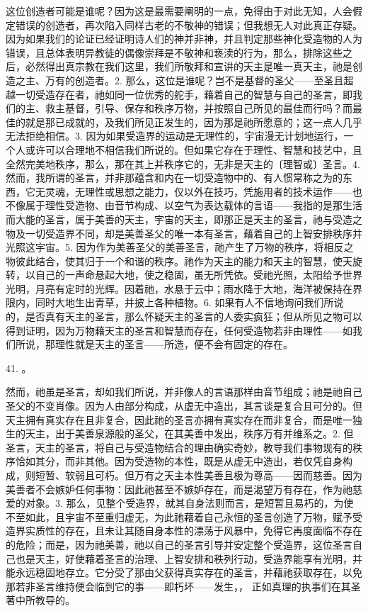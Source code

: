 这位创造者可能是谁呢？因为这是最需要阐明的一点，免得由于对此无知，人会假定错误的创造者，再次陷入同样古老的不敬神的错误；但我想无人对此真正存疑。因为如果我们的论证已经证明诗人们的神并非神，并且判定那些神化受造物的人为错误，且总体表明异教徒的偶像崇拜是不敬神和亵渎的行为，那么，排除这些之后，必然得出真宗教在我们这里，我们所敬拜和宣讲的天主是唯一真天主，祂是创造之主、万有的创造者。2. 那么，这位是谁呢？岂不是基督的圣父——至圣且超越一切受造存在者，祂如同一位优秀的舵手，藉着自己的智慧与自己的圣言，即我们的主、救主基督，引导、保存和秩序万物，并按照自己所见的最佳而行吗？而最佳的就是那已成就的，及我们所见正发生的，因为那是祂所愿意的；这一点人几乎无法拒绝相信。3. 因为如果受造界的运动是无理性的，宇宙漫无计划地运行，一个人或许可以合理地不相信我们所说的。但如果它存在于理性、智慧和技艺中，且全然完美地秩序，那么，那在其上并秩序它的，无非是天主的〔理智或〕圣言。4. 然而，我所谓的圣言，并非那蕴含和内在一切受造物中的、有人惯常称之为的东西，它无灵魂，无理性或思想之能力，仅以外在技巧，凭施用者的技术运作——也不像属于理性受造物、由音节构成、以空气为表达载体的言语——我指的是那生活而大能的圣言，属于美善的天主，宇宙的天主，即那正是天主的圣言，祂与受造之物及一切受造界不同，却是美善圣父的唯一本有圣言，藉着自己的上智安排秩序并光照这宇宙。5. 因为作为美善圣父的美善圣言，祂产生了万物的秩序，将相反之物彼此结合，使其归于一个和谐的秩序。祂作为天主的能力和天主的智慧，使天旋转，以自己的一声命悬起大地，使之稳固，虽无所凭依。受祂光照，太阳给予世界光明，月亮有定时的光辉。因着祂，水悬于云中；雨水降于大地，海洋被保持在界限内，同时大地生出青草，并披上各种植物。6. 如果有人不信地询问我们所说的，是否真有天主的圣言，那么怀疑天主的圣言的人委实疯狂；但从所见之物可以得到证明，因为万物藉天主的圣言和智慧而存在，任何受造物若非由理性——如我们所说，那理性就是天主的圣言——所造，便不会有固定的存在。\par

41. 。\par

然而，祂虽是圣言，却如我们所说，并非像人的言语那样由音节组成；祂是祂自己圣父的不变肖像。因为人由部分构成，从虚无中造出，其言谈是复合且可分的。但天主拥有真实存在且非复合，因此祂的圣言亦拥有真实存在而非复合，而是唯一独生的天主，出于美善泉源般的圣父，在其美善中发出，秩序万有并维系之。2. 但圣言，天主的圣言，将自己与受造物结合的理由确实奇妙，教导我们事物现有的秩序恰如其分，而非其他。因为受造物的本性，既是从虚无中造出，若仅凭自身构成，则短暂、软弱且可朽。但万有之天主本性美善且极为尊高——因而慈善。因为美善者不会嫉妒任何事物：因此祂甚至不嫉妒存在，而是渴望万有存在，作为祂慈爱的对象。3. 那么，见整个受造界，就其自身法则而言，是短暂且易朽的，为使不至如此，且宇宙不至重归虚无，为此祂藉着自己永恒的圣言创造了万物，赋予受造界实质性的存在，且未让其随自身本性的漂荡于风暴中，免得它再度面临不存在的危险；而是，因为祂美善，祂以自己的圣言引导并安定整个受造界，这位圣言自己也是天主，好使藉着圣言的治理、上智安排和秩列行动，受造界能享有光明，并能永远稳固地存立。它分受了那由父获得真实存在的圣言，并藉祂获取存在，以免那若非圣言维持便会临到它的事——即朽坏——发生，， 正如真理的执事们在其圣著中所教导的。\par

